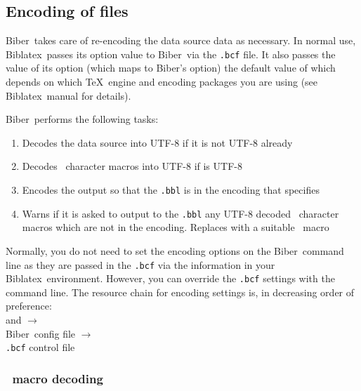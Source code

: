 \documentclass{ltxdockit}
\newcommand*{\biber}{Biber\xspace}
\newcommand*{\biblatex}{Biblatex\xspace}
\begin{document}
\subsection{Encoding of files}

\biber\ takes care of re-encoding the data source data as
necessary. In normal use, \biblatex\ passes its
 option value to \biber\ via the \verb+.bcf+
file. It also passes the value of its  option (which
maps to \biber's  option) the default value
of which depends on which \TeX\ engine and encoding packages you are
using (see \biblatex\ manual for details).

\noindent \biber\ performs the following tasks:

\begin{enumerate}
\item Decodes the data source into UTF-8 if it is not UTF-8 already
\item Decodes \latex\ character macros into UTF-8 if 
  is UTF-8
\item Encodes the output so that the \verb+.bbl+ is in
  the encoding that  specifies
\item Warns if it is asked to output to the \verb+.bbl+ any UTF-8
  decoded \latex\ character macros which are not in the
   encoding. Replaces with a suitable \latex\ macro
\end{enumerate}

\noindent Normally, you do not need to set the encoding options on the
\biber\ command line as they are passed in the \verb+.bcf+ via the
information in your \biblatex\ environment. However, you can override
the \verb+.bcf+ settings with the command line. The resource chain for
encoding settings is, in decreasing order
of preference:\\[2ex]

\noindent{} and  $\rightarrow$\\
\hspace*{1em}\biber\ config file $\rightarrow$\\
\hspace*{2em}\verb+.bcf+ control file

\subsubsection{\latex\ macro decoding}\label{ldecode}
\end{document}
